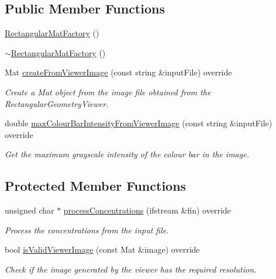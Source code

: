 \subsection*{\-Public \-Member \-Functions}
\begin{DoxyCompactItemize}
\item 
\hyperlink{classmultiscale_1_1analysis_1_1RectangularMatFactory_a20b4c70b7964fb40c4767ab2d7e1ae92}{\-Rectangular\-Mat\-Factory} ()
\item 
\hyperlink{classmultiscale_1_1analysis_1_1RectangularMatFactory_a3ebedd3691965c3d89c3ecdaa3e66d70}{$\sim$\-Rectangular\-Mat\-Factory} ()
\item 
\-Mat \hyperlink{classmultiscale_1_1analysis_1_1RectangularMatFactory_a3f86c9bd73eb8d8a27f272b47e984871}{create\-From\-Viewer\-Image} (const string \&input\-File) override
\begin{DoxyCompactList}\small\item\em \-Create a \-Mat object from the image file obtained from the \-Rectangular\-Geometry\-Viewer. \end{DoxyCompactList}\item 
double \hyperlink{classmultiscale_1_1analysis_1_1RectangularMatFactory_a9255b11748b4c48d76c769258d6b6ee0}{max\-Colour\-Bar\-Intensity\-From\-Viewer\-Image} (const string \&input\-File) override
\begin{DoxyCompactList}\small\item\em \-Get the maximum grayscale intensity of the colour bar in the image. \end{DoxyCompactList}\end{DoxyCompactItemize}
\subsection*{\-Protected \-Member \-Functions}
\begin{DoxyCompactItemize}
\item 
unsigned char $\ast$ \hyperlink{classmultiscale_1_1analysis_1_1RectangularMatFactory_a6cc84a4eadbab5046cb6eacba64f5ae4}{process\-Concentrations} (ifstream \&fin) override
\begin{DoxyCompactList}\small\item\em \-Process the concentrations from the input file. \end{DoxyCompactList}\item 
bool \hyperlink{classmultiscale_1_1analysis_1_1RectangularMatFactory_a398913bbfa8ca9d80cb630c29a37a135}{is\-Valid\-Viewer\-Image} (const \-Mat \&image) override
\begin{DoxyCompactList}\small\item\em \-Check if the image generated by the viewer has the required resolution. \end{DoxyCompactList}\end{DoxyCompactItemize}
